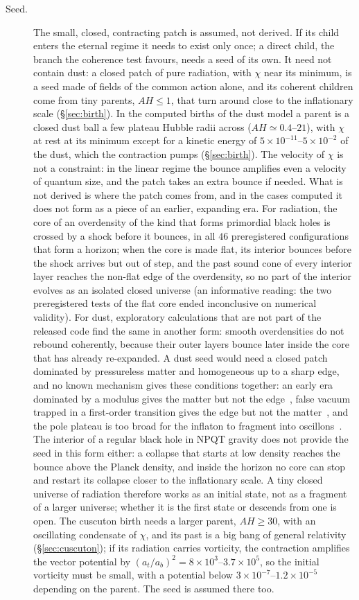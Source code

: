 \documentclass[11pt,a4paper]{article}
\begin{document}
\begin{description}
\item[Seed.] The small, closed, contracting patch is assumed, not derived. If its child enters the eternal regime it needs to exist only once; a direct child, the branch the coherence test favours, needs a seed of its own. It need not contain dust: a closed patch of pure radiation, with $\chi$ near its minimum, is a seed made of fields of the common action alone, and its coherent children come from tiny parents, $AH\le1$, that turn around close to the inflationary scale (\S\ref{sec:birth}). In the computed births of the dust model a parent is a closed dust ball a few plateau Hubble radii across ($AH\simeq0.4$--$21$), with $\chi$ at rest at its minimum except for a kinetic energy of $5\times10^{-11}$--$5\times10^{-2}$ of the dust, which the contraction pumps (\S\ref{sec:birth}). The velocity of $\chi$ is not a constraint: in the linear regime the bounce amplifies even a velocity of quantum size, and the patch takes an extra bounce if needed. What is not derived is where the patch comes from, and in the cases computed it does not form as a piece of an earlier, expanding era. For radiation, the core of an overdensity of the kind that forms primordial black holes is crossed by a shock before it bounces, in all $46$ preregistered configurations that form a horizon; when the core is made flat, its interior bounces before the shock arrives but out of step, and the past sound cone of every interior layer reaches the non-flat edge of the overdensity, so no part of the interior evolves as an isolated closed universe (an informative reading: the two preregistered tests of the flat core ended inconclusive on numerical validity). For dust, exploratory calculations that are not part of the released code find the same in another form: smooth overdensities do not rebound coherently, because their outer layers bounce later inside the core that has already re-expanded. A dust seed would need a closed patch dominated by pressureless matter and homogeneous up to a sharp edge, and no known mechanism gives these conditions together: an early era dominated by a modulus gives the matter but not the edge~\cite{KSW2015}, false vacuum trapped in a first-order transition gives the edge but not the matter~\cite{Liu2022PT}, and the pole plateau is too broad for the inflaton to fragment into oscillons~\cite{Amin2012}. The interior of a regular black hole in NPQT gravity does not provide the seed in this form either: a collapse that starts at low density reaches the bounce above the Planck density, and inside the horizon no core can stop and restart its collapse closer to the inflationary scale. A tiny closed universe of radiation therefore works as an initial state, not as a fragment of a larger universe; whether it is the first state or descends from one is open. The cuscuton birth needs a larger parent, $AH\ge30$, with an oscillating condensate of $\chi$, and its past is a big bang of general relativity (\S\ref{sec:cuscuton}); if its radiation carries vorticity, the contraction amplifies the vector potential by $(a_t/a_b)^2=8\times10^{3}$--$3.7\times10^{5}$, so the initial vorticity must be small, with a potential below $3\times10^{-7}$--$1.2\times10^{-5}$ depending on the parent. The seed is assumed there too.

\end{description}
\end{document}
